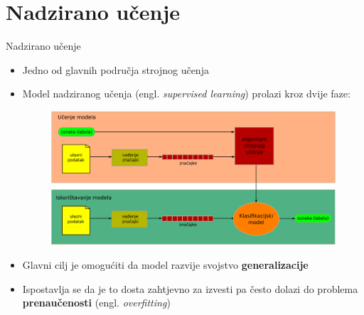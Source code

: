 \documentclass{beamer}
\begin{document}
\section{Nadzirano učenje}
	\begin{frame}{Nadzirano učenje}
		\begin{itemize}
			\item Jedno od glavnih područja strojnog učenja
			\item Model nadziranog učenja (engl. \textit{supervised learning}) prolazi kroz dvije faze:
			\bigskip
			\begin{figure}
			    \pause
			    \includegraphics[scale=0.35]{img/supervised-learning-flow.png}
		    \end{figure}
		    \bigskip
		    \pause
		    \item Glavni cilj je omogućiti da model razvije svojstvo \textbf{generalizacije}
		    \item Ispostavlja se da je to dosta zahtjevno za izvesti pa često dolazi do problema \textbf{prenaučenosti} (engl. \textit{overfitting})
		\end{itemize}
	\end{frame}
\end{document}
